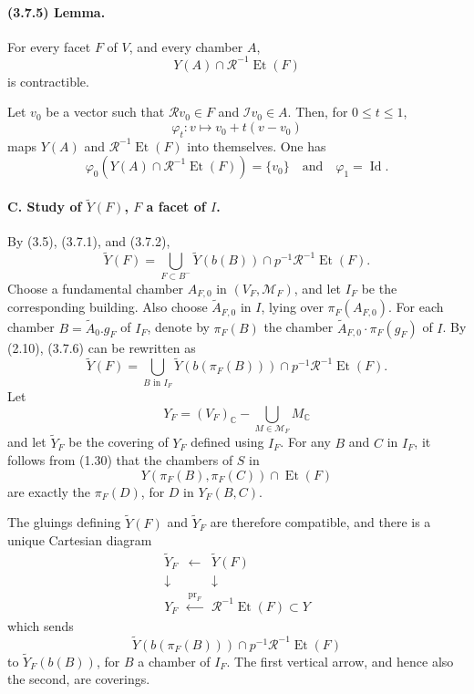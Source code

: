 \documentclass[10pt]{article}
\newcommand{\C}{\mathbb C}
\begin{document}
\paragraph{(3.7.5) Lemma.} For every facet \(F\) of \(V\), and every chamber \(A\),
\[
Y(A)\cap\mathcal R^{-1}\operatorname{Et}(F)
\]
is contractible.

Let \(v_0\) be a vector such that \(\mathcal Rv_0\in F\) and \(\mathcal Iv_0\in A\). Then, for \(0\le t\le1\),
\[
\varphi_t:v\longmapsto v_0+t(v-v_0)
\]
maps \(Y(A)\) and \(\mathcal R^{-1}\operatorname{Et}(F)\) into themselves. One has
\[
\varphi_0(Y(A)\cap\mathcal R^{-1}\operatorname{Et}(F))=\{v_0\}
\quad\text{and}\quad
\varphi_1=\operatorname{Id}.
\]

\paragraph{C. Study of \(\widetilde Y(F)\), \(F\) a facet of \(I\).} By (3.5), (3.7.1), and (3.7.2),
\[
\tag{3.7.6}
\widetilde Y(F)=
\bigcup_{F\subset B^-}
\widetilde Y(b(B))\cap p^{-1}\mathcal R^{-1}\operatorname{Et}(F).
\]
Choose a fundamental chamber \(A_{F,0}\) in \((V_F,\mathcal M_F)\), and let \(I_F\) be the corresponding building. Also choose \(\widetilde A_{F,0}\) in \(I\), lying over \(\pi_F(A_{F,0})\). For each chamber \(B=\widetilde A_0.g_F\) of \(I_F\), denote by \(\pi_F(B)\) the chamber \(\widetilde A_{F,0}\cdot\pi_F(g_F)\) of \(I\). By (2.10), (3.7.6) can be rewritten as
\[
\widetilde Y(F)=
\bigcup_{B\text{ in }I_F}
\widetilde Y(b(\pi_F(B)))\cap p^{-1}\mathcal R^{-1}\operatorname{Et}(F).
\]
Let
\[
Y_F=(V_F)_\C-\bigcup_{M\in\mathcal M_F}M_\C
\]
and let \(\widetilde Y_F\) be the covering of \(Y_F\) defined using \(I_F\). For any \(B\) and \(C\) in \(I_F\), it follows from (1.30) that the chambers of \(S\) in
\[
Y(\pi_F(B),\pi_F(C))\cap\operatorname{Et}(F)
\]
are exactly the \(\pi_F(D)\), for \(D\) in \(Y_F(B,C)\).

The gluings defining \(\widetilde Y(F)\) and \(\widetilde Y_F\) are therefore compatible, and there is a unique Cartesian diagram
\[
\tag{3.7.7}
\begin{array}{ccc}
\widetilde Y_F&\longleftarrow&\widetilde Y(F)\\
\downarrow&&\downarrow\\
Y_F&\xleftarrow{\operatorname{pr}_F}&\mathcal R^{-1}\operatorname{Et}(F)\subset Y
\end{array}
\]
which sends
\[
\widetilde Y(b(\pi_F(B)))\cap p^{-1}\mathcal R^{-1}\operatorname{Et}(F)
\]
to \(\widetilde Y_F(b(B))\), for \(B\) a chamber of \(I_F\). The first vertical arrow, and hence also the second, are coverings.
\end{document}

